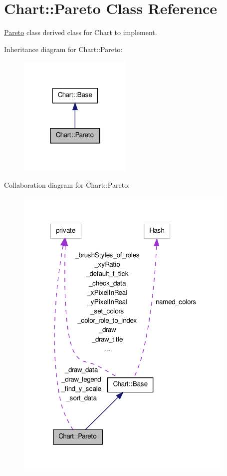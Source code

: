 \hypertarget{classChart_1_1Pareto}{
\section{Chart::Pareto Class Reference}
\label{classChart_1_1Pareto}
}


\hyperlink{classChart_1_1Pareto}{Pareto} class derived class for Chart to implement.  




Inheritance diagram for Chart::Pareto:\nopagebreak
\begin{figure}[H]
\begin{center}
\leavevmode
\includegraphics[width=154pt]{classChart_1_1Pareto__inherit__graph}
\end{center}
\end{figure}


Collaboration diagram for Chart::Pareto:\nopagebreak
\begin{figure}[H]
\begin{center}
\leavevmode
\includegraphics[width=299pt]{classChart_1_1Pareto__coll__graph}
\end{center}
\end{figure}
